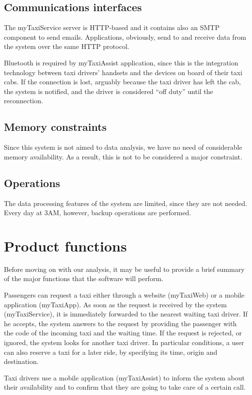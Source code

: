 \subsection{Communications interfaces}
The myTaxiService server is HTTP-based and it contains also an SMTP component to send emails. Applications, obviously, send to and receive data from the system over the same HTTP protocol.

Bluetooth is required by myTaxiAssist application, since this is the integration technology between taxi drivers' handsets and the devices on board of their taxi cabs. If the connection is lost, arguably because the taxi driver has left the cab, the system is notified, and the driver is considered ``off duty'' until the reconnection.


\subsection{Memory constraints}
Since this system is not aimed to data analysis, we have no need of considerable memory availability. As a result, this is not to be considered a major constraint.


\subsection{Operations}
The data processing features of the system are limited, since they are not needed. Every day at 3AM, however, backup operations are performed. 


\section{Product functions}  
Before moving on with our analysis, it may be useful to provide a brief summary of the major functions that the software will perform. 

Passengers can request a taxi either through a website (myTaxiWeb) or a mobile application (myTaxiApp). As soon as the request is received by the system (myTaxiService), it is immediately forwarded to the nearest waiting taxi driver. If he accepts, the system answers to the request by providing the passenger with the code of the incoming taxi and the waiting time. If the request is rejected, or ignored, the system looks for another taxi driver. In particular conditions, a user can also reserve a taxi for a later ride, by specifying its time, origin and destination. 

Taxi drivers use a mobile application (myTaxiAssist) to inform the system about their availability and to confirm that they are going to take care of a certain call. 


